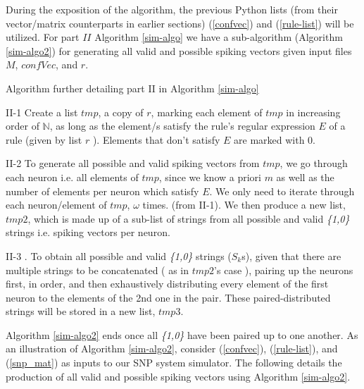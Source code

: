 \documentclass{svmultm}
\newcommand{\redmark}[1]{\color{red} #1 \color{black}}
\begin{document}
During the exposition of the algorithm, the previous Python
lists (from their vector/matrix counterparts in earlier
sections) (\ref{confvec}) and (\ref{rule-list}) will be utilized. For part $II$ Algorithm \ref{sim-algo} we have a sub-algorithm (Algorithm \ref{sim-algo2}) for generating all valid
and possible spiking vectors given input files $M$, $confVec$, and $r$.


\begin{algorithm}
\caption{Algorithm further detailing part II in Algorithm \ref{sim-algo}}
\label{sim-algo2}
\begin{algorithmic}
\item [II-1] Create a list $tmp$, a copy of $r$, marking
each element of $tmp$ in increasing order of $\mathbb N$,
as long as the element/s satisfy the rule's 
regular expression $E$ of a rule (given by list
$r$ ). Elements that don't satisfy $E$ are marked with 0.\\
 
\item [II-2] To generate all possible and valid spiking vectors from
$tmp$, we go through each neuron i.e. all elements of $tmp$,
since we know a priori $m$ as well as the number of
elements per neuron which satisfy $E$. We only need to iterate
through each neuron/element of $tmp$, $\omega$ times. 
(from II-1). We then produce a new list, $tmp2$, which is
made up of a sub-list of strings from all possible and valid
\textit{\{1,0\}} strings i.e. spiking vectors per neuron.\\

\item  [II-3]. To obtain all possible and valid \textit{\{1,0\}}
strings ($S_k$s), given that there are multiple strings
to be concatenated ( as in $tmp2$'s case ), pairing up the
neurons first, in order, and then exhaustively distributing
every element of the first neuron to the elements of the 2nd
one in the pair. These paired-distributed strings will be stored in a new list, $tmp3$.

\end{algorithmic}
\end{algorithm}

Algorithm \ref{sim-algo2} ends once all \textit{\{1,0\}} have been paired up to one another. As an illustration of Algorithm \ref{sim-algo2}, consider (\ref{confvec}), (\ref{rule-list}), and (\ref{snp_mat}) as inputs to our SNP system simulator. The following details the production of all valid and possible spiking vectors using Algorithm \ref{sim-algo2}.
\end{document}

